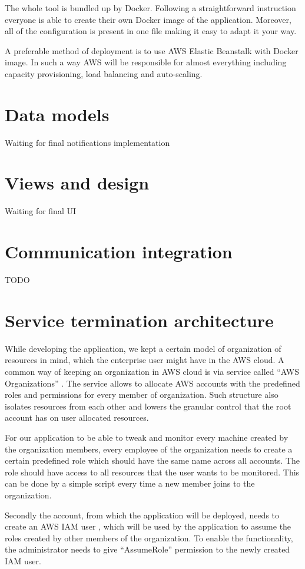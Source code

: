 \documentclass[licencjacka,en]{thesisclass}
\begin{document}
    The whole tool is bundled up by Docker.
    Following a straightforward instruction everyone is able to create their own Docker image of the application.
    Moreover, all of the configuration is present in one file making it easy to adapt it your way.

    A preferable method of deployment is to use AWS Elastic Beanstalk with Docker image.
    In such a way AWS will be responsible for almost everything including capacity provisioning, load balancing and auto-scaling.

    \section{Data models}
    Waiting for final notifications implementation
    \section{Views and design}
    Waiting for final UI
    \section{Communication integration}
    TODO
    \section{Service termination architecture}
    While developing the application, we kept a certain model of organization of resources in mind, which the enterprise user might have in the AWS cloud. A common way of keeping an organization in AWS cloud is via service called “AWS Organizations” \cite{AWSOrganizations}. The service allows to allocate AWS accounts with the predefined roles and permissions for every member of organization. Such structure also isolates resources from each other and lowers the granular control that the root account has on user allocated resources.

For our application to be able to tweak and monitor every machine created by the organization members, every employee of the organization needs to create a certain predefined role which should have the same name across all accounts. The role should have access to all resources that the user wants to be monitored. This can be done by a simple script every time a new member joins to the organization.

Secondly the account, from which the application will be deployed, needs to create an AWS IAM user \cite{AWSIAM}, which will be used by the application to assume the roles created by other members of the organization. To enable the functionality, the administrator needs to give “AssumeRole” permission to the newly created IAM user.
\end{document}
